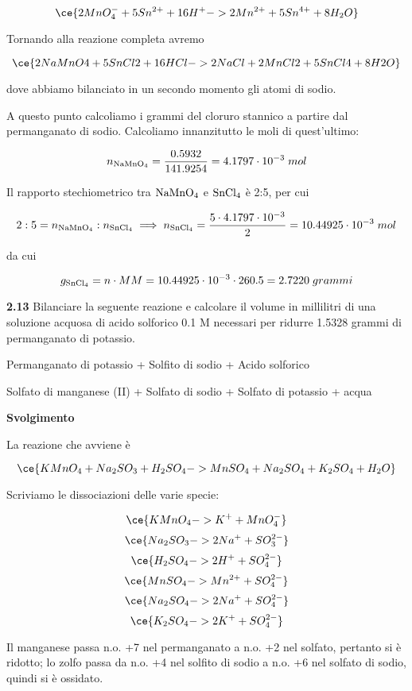 $$\ce{2MnO_4^- + 5Sn^{2+} + 16H^+ -> 2Mn^{2+} + 5Sn^{4+} + 8H_2O}$$

Tornando alla reazione completa avremo

$$\ce{2NaMnO4 + 5SnCl2 + 16HCl -> 2NaCl + 2MnCl2 + 5SnCl4 + 8H2O}$$

dove abbiamo bilanciato in un secondo momento gli atomi di sodio.

A questo punto calcoliamo i grammi del cloruro stannico a partire dal permanganato di sodio. Calcoliamo innanzitutto le moli di quest'ultimo:

$$n_{\rm NaMnO_4}=\frac{0.5932}{141.9254}
=4.1797 \cdot 10^{-3}\;mol$$

Il rapporto stechiometrico tra $\rm NaMnO_4$ e $\rm SnCl_4$ è 2:5, per cui 

$$2:5=n_{\rm NaMnO_4}:n_{\rm SnCl_4}
\implies
n_{\rm SnCl_4}=\frac{5 \cdot 4.1797 \cdot 10^{-3}}{2}
=10.44925 \cdot 10^{-3}\;mol$$

da cui

$$g_{\rm SnCl_4}=n \cdot MM=10.44925 \cdot 10^{-3} \cdot 260.5=2.7220\;grammi$$

\vspace{0.2cm}\textbf{2.13} Bilanciare la seguente reazione e calcolare il volume in millilitri di una soluzione acquosa di acido solforico 0.1 M necessari per ridurre 1.5328 grammi di permanganato di potassio.

\begin{center}
    Permanganato di potassio + Solfito di sodio + Acido solforico \ce{->}

    \ce{->} Solfato di manganese (II) + Solfato di sodio + Solfato di potassio + acqua
\end{center}

\vspace{0.2cm}\large\textbf{Svolgimento}\normalsize

\vspace{0.2cm}La reazione che avviene è

$$\ce{KMnO_4 + Na_2SO_3 + H_2SO_4 -> MnSO_4 + Na_2SO_4 + K_2SO_4 + H_2O}$$

Scriviamo le dissociazioni delle varie specie:

$$\ce{KMnO_4 -> K^+ + MnO_4^-}$$
$$\ce{Na_2SO_3 -> 2Na^+ + SO_3^{2-}}$$
$$\ce{H_2SO_4 -> 2H^+ + SO_4^{2-}}$$
$$\ce{MnSO_4 -> Mn^{2+} + SO_4^{2-}}$$
$$\ce{Na_2SO_4 -> 2Na^+ + SO_4^{2-}}$$
$$\ce{K_2SO_4 -> 2K^+ + SO_4^{2-}}$$

Il manganese passa n.o. +7 nel permanganato a n.o. +2 nel solfato, pertanto si è ridotto; lo zolfo passa da n.o. +4 nel solfito di sodio a n.o. +6 nel solfato di sodio, quindi si è ossidato.

